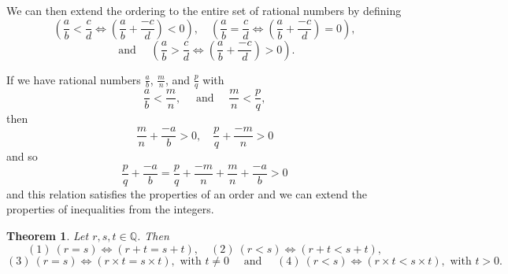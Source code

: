 \documentclass[
]{book}
\newtheorem{theorem}{Theorem}[chapter]
\theoremstyle{definition}
\theoremstyle{definition}
\theoremstyle{definition}
\theoremstyle{remark}
\begin{document}
We can then extend the ordering to the entire set of rational numbers by defining
\[\left(\frac{a}{b} < \frac{c}{d} \Leftrightarrow \left(\frac{a}{b} + \frac{-c}{d}\right) <0 \right), \quad
\left(\frac{a}{b} = \frac{c}{d} \Leftrightarrow \left(\frac{a}{b} + \frac{-c}{d}\right) = 0 \right),\]
\[\mbox{ and } \quad \left(\frac{a}{b} > \frac{c}{d} \Leftrightarrow \left(\frac{a}{b} + \frac{-c}{d}\right) > 0 \right).\]

If we have rational numbers \(\frac{a}{b}\), \(\frac{m}{n}\), and \(\frac{p}{q}\) with
\[\frac{a}{b} < \frac{m}{n}, \quad \mbox{ and } \quad \frac{m}{n} < \frac{p}{q},\] then
\[\frac{m}{n}+ \frac{-a}{b} >0, \quad \frac{p}{q}+ \frac{-m}{n} >0\] and so
\[\frac{p}{q} + \frac{-a}{b} = \frac{p}{q}+ \frac{-m}{n} + \frac{m}{n}+ \frac{-a}{b}>0\]
and this relation satisfies the properties of an order and we can extend the properties of inequalities from the integers.

\begin{theorem}
\protect\hypertarget{thm:unnamed-chunk-95}{}{\label{thm:unnamed-chunk-95} }Let \(r,s,t\in \mathbb{Q}\). Then \[(1) \: (r=s) \Leftrightarrow (r+t=s+t),  \quad (2) \: (r<s) \Leftrightarrow (r+t<s+t),\]
\[(3) \: (r=s) \Leftrightarrow (r\times t=s\times t), \mbox{ with } t\neq 0 \quad \mbox{ and } \quad (4) \: (r<s) \Leftrightarrow (r\times t<s\times t), \mbox{ with } t> 0.\]
\end{theorem}
\end{document}
